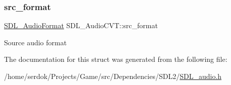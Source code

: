 \subsubsection{\texorpdfstring{src\+\_\+format}{src\_format}}
{\footnotesize\ttfamily \hyperlink{SDL__audio_8h_a491ed103fd25d920c4e6b7495217ce66}{S\+D\+L\+\_\+\+Audio\+Format} S\+D\+L\+\_\+\+Audio\+C\+V\+T\+::src\+\_\+format}

Source audio format 

The documentation for this struct was generated from the following file\+:\begin{DoxyCompactItemize}
\item 
/home/serdok/\+Projects/\+Game/src/\+Dependencies/\+S\+D\+L2/\hyperlink{SDL__audio_8h}{S\+D\+L\+\_\+audio.\+h}\end{DoxyCompactItemize}
